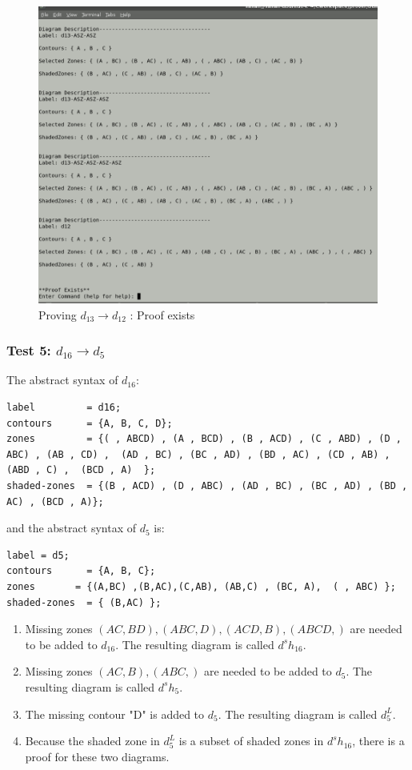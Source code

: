\documentclass[10pt, a4paper, titlepage]{article}
\begin{document}
\begin{figure}[h]
\centering
\includegraphics[scale=0.4]{images/ss7.png}
\caption{Proving $  d_{13} \rightarrow d_{12} $ : Proof exists}
\label{fig:test5}
\end{figure}

\subsubsection{Test 5: $ d_{16} \rightarrow  d_{5} $}

The abstract syntax of $d _{16} $:
\small
\begin{lstlisting}
label 		  = d16;
contours      = {A, B, C, D};
zones		  = {( , ABCD) , (A , BCD) , (B , ACD) , (C , ABD) , (D , ABC) , (AB , CD) ,  (AD , BC) , (BC , AD) , (BD , AC) , (CD , AB) , (ABD , C) ,  (BCD , A)  };
shaded-zones  = {(B , ACD) , (D , ABC) , (AD , BC) , (BC , AD) , (BD , AC) , (BCD , A)};
\end{lstlisting}
\large

and the abstract syntax of $ d_{5} $ is:

\small
\begin{lstlisting}
label = d5;
contours      = {A, B, C};
zones		= {(A,BC) ,(B,AC),(C,AB), (AB,C) , (BC, A),  ( , ABC) };
shaded-zones  = { (B,AC) };
\end{lstlisting}
\large

\begin{enumerate}
\item Missing zones $ (AC , BD) , (ABC , D) , (ACD , B) , (ABCD , ) $ are needed to be added to $ d_{16} $. The resulting diagram is called $ d^sh_{16} $.
\item Missing zones $ (AC , B) , (ABC , )  $ are needed to be added to $ d_{5} $. The resulting diagram is called $ d^sh_{5} $.
\item The missing contour "D" is added to $ d_{5} $. The resulting diagram is called $ d^L_{5} $.
\item Because the shaded zone in $ d^L_{5} $ is a subset of shaded zones in $ d^sh_{16} $, there is a proof for these two diagrams.
\end{enumerate}  
\end{document}
